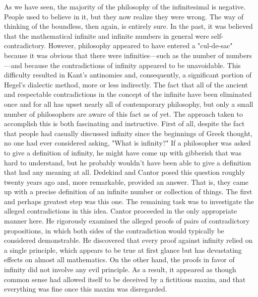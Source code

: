 \documentclass[a4paper,12pt]{book}[2004/02/16]
\theoremstyle{ilemma}
\theoremstyle{itheorem}
\theoremstyle{iother}
\theoremstyle{icorollary}
\theoremstyle{numcorollary}
\theoremstyle{idefinition}
\begin{document}
As we have seen, the majority of the philosophy of the infinitesimal is negative. People used to believe in it, but they now realize they were wrong. The way of thinking of the boundless, then again, is
entirely sure. In the past, it was believed that the mathematical infinite and infinite numbers in general were self-contradictory. However, philosophy appeared to have entered a "cul-de-sac" because it was obvious that there were infinities—such as the number of numbers—and because the contradictions of infinity appeared to be unavoidable. This difficulty resulted in Kant's antinomies and, consequently, a significant portion of Hegel's dialectic method, more or less indirectly. The fact that all of the ancient and respectable contradictions in the concept of the infinite have been eliminated once and for all has upset nearly all of contemporary philosophy, but only a small number of philosophers are aware of this fact as of yet. The approach taken to accomplish this is both fascinating and instructive. First of all, despite the fact that people had casually discussed infinity since the beginnings of Greek thought, no one had ever considered asking, "What is infinity?" If a philosopher was asked to give a definition of infinity, he might have come up with gibberish that was hard to understand, but he probably wouldn't have been able to give a definition that had any meaning at all. Dedekind and Cantor posed this question roughly twenty years ago and, more remarkable, provided an answer. That is, they came up with a precise definition of an infinite number or collection of things. The first and perhaps greatest step was this one. The remaining task was to investigate the alleged contradictions in this idea. Cantor proceeded in the only appropriate manner here. He rigorously examined the alleged proofs of pairs of contradictory propositions, in which both sides of the contradiction would typically be considered demonstrable. He discovered that every proof against infinity relied on a single principle, which appears to be true at first glance but has devastating effects on almost all mathematics. On the other hand, the proofs in favor of infinity did not involve any evil principle. As a result, it appeared as though common sense had allowed itself to be deceived by a fictitious maxim, and that everything was fine once this maxim was disregarded.
\end{document}
